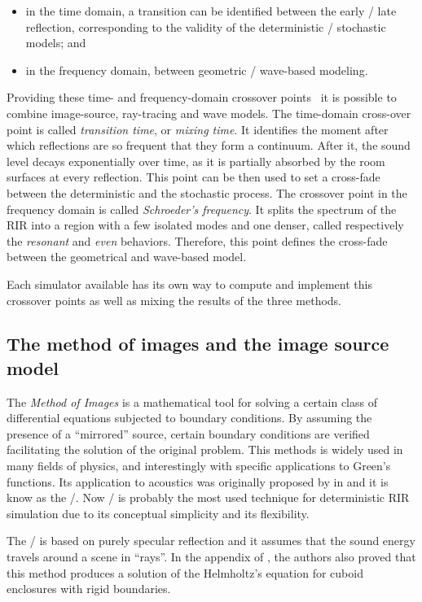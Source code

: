 \begin{itemize}
    \item in the time domain, a transition can be identified between the early \vs/ late reflection, corresponding to the validity of the deterministic \vs/ stochastic models; and
    \item in the frequency domain, between geometric \vs/ wave-based modeling.
\end{itemize}
Providing these time- and frequency-domain crossover points~ it is possible to combine image-source, ray-tracing and wave models.
The time-domain cross-over point is called \textit{transition time}, or \textit{mixing time}.
It identifies the moment after which reflections are so frequent that they form a continuum.
After it, the sound level decays exponentially over time, as it is partially absorbed by the room surfaces at every reflection.
This point can be then used to set a cross-fade between the deterministic and the stochastic process.
The crossover point in the frequency domain is called \textit{Schroeder's frequency}.
It splits the spectrum of the \ac{RIR} into a region with a few isolated modes and one denser, called respectively the \textit{resonant} and \textit{even} behaviors.
Therefore, this point defines the cross-fade between the geometrical and wave-based model.

\mynewline
Each simulator available has its own way to compute and implement this crossover points as well as mixing the results of the three methods.

\subsection{The method of images and the image source model}\label{subsec:acoustics:ism}
The \textit{Method of Images} is a mathematical tool for solving a certain class of differential equations subjected to boundary conditions.
By assuming the presence of a ``mirrored'' source, certain boundary conditions are verified facilitating the solution of the original problem.
This methods is widely used in many fields of physics, and interestingly with specific applications to Green's functions.
Its application to acoustics was originally proposed by \citeauthor{allen1979image} in  and it is know as the \ISMdef/.
Now \ISM/ is probably the most used technique for deterministic \ac{RIR} simulation due to its conceptual simplicity and its flexibility.

\mynewline
The \ISM/ is based on purely specular reflection and it assumes that the sound energy travels around a scene in ``rays''.
In the appendix of , the authors also proved that this method produces a solution of the Helmholtz's equation
for cuboid enclosures with rigid boundaries.

